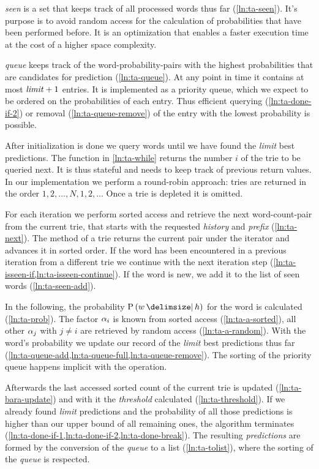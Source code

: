 \emph{seen} is a set that keeps track of all processed words thus far
(\cref{ln:ta-seen}).
It's purpose is to avoid random access for the calculation of probabilities
that have been performed before.
It is an optimization that enables a faster execution time at the cost of
a higher space complexity.

\emph{queue} keeps track of the word-probability-pairs with the highest
probabilities that are candidates for prediction (\cref{ln:ta-queue}).
At any point in time it contains at most $\text{\emph{limit}} + 1$ entries.
It is implemented as a priority queue, which we expect to be ordered on
the probabilities of each entry.
Thus efficient querying (\cref{ln:ta-done-if-2}) or removal
(\cref{ln:ta-queue-remove}) of the entry with the lowest probability is
possible.

After initialization is done we query words until we have found the \emph{limit}
best predictions.
The  function in \cref{ln:ta-while} returns the number $i$
of the trie to be queried next.
It is thus stateful and needs to keep track of previous return values.
In our implementation we perform a round-robin approach: tries are
returned in the order $1, 2, \ldots, N, 1, 2, \ldots$
Once a trie is depleted it is omitted.

For each iteration we perform sorted access and retrieve the next
word-count-pair from the current trie, that starts with the requested
\emph{history} and \emph{prefix} (\cref{ln:ta-next}).
The  method of a trie returns the current pair under
the iterator and advances it in sorted order.
If the word has been encountered in a previous iteration from a different trie
we continue with the next iteration step
(\cref{ln:ta-isseen-if,ln:ta-isseen-continue}).
If the word is new, we add it to the list of seen words (\cref{ln:ta-seen-add}).

In the following, the probability $\Prob{w}{h}$ for the word is calculated
(\cref{ln:ta-prob}).
The factor $\alpha_i$ is known from sorted access (\cref{ln:ta-a-sorted}), all
other $\alpha_j$ with $j \neq i$ are retrieved by random access
(\cref{ln:ta-a-random}).
With the word's probability we update our record of the \emph{limit} best
predictions thus far
(\cref{ln:ta-queue-add,ln:ta-queue-full,ln:ta-queue-remove}).
The sorting of the priority queue happens implicit with the
 operation.

Afterwards the last accessed sorted count of the current trie is updated
(\cref{ln:ta-bara-update}) and with it the \emph{threshold} calculated
(\cref{ln:ta-threshold}).
If we already found \emph{limit} predictions and the probability of all those
predictions is higher than our upper bound of all remaining ones, the algorithm
terminates (\cref{ln:ta-done-if-1,ln:ta-done-if-2,ln:ta-done-break}).
The resulting \emph{predictions} are formed by the conversion of the
\emph{queue} to a list (\cref{ln:ta-tolist}), where the sorting of the
\emph{queue} is respected.

